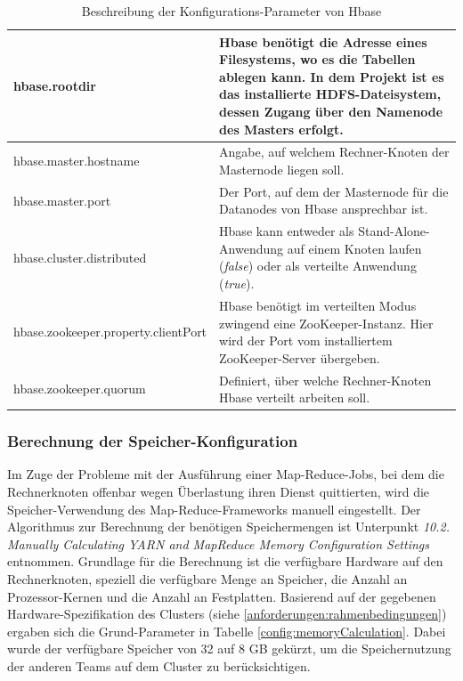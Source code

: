 \begin{table}
	\begin{tabularx}{\textwidth}{| X | X |} \hline
	hbase.rootdir &  Hbase benötigt die Adresse eines Filesystems, wo es die Tabellen ablegen kann. In dem Projekt ist es das installierte
	HDFS-Dateisystem, dessen Zugang über den Namenode des Masters erfolgt.\\ \hline
	hbase.master.hostname & Angabe, auf welchem Rechner-Knoten der Masternode liegen soll.\\ \hline
	hbase.master.port & Der Port, auf dem der Masternode für die Datanodes von Hbase ansprechbar ist. \\ \hline
	hbase.cluster.distributed & Hbase kann entweder als Stand-Alone-Anwendung auf einem Knoten laufen (\textit{false}) oder als verteilte
	 Anwendung (\textit{true}). \\ \hline
	hbase.zookeeper.property.clientPort & Hbase benötigt im verteilten Modus zwingend eine ZooKeeper-Instanz. Hier wird der Port vom
	 installiertem ZooKeeper-Server übergeben.\\ \hline
	hbase.zookeeper.quorum &  Definiert, über welche Rechner-Knoten Hbase verteilt arbeiten soll. \\ \hline
	\end{tabularx}
	\caption{Beschreibung der Konfigurations-Parameter von Hbase}
	\label{config:hbaseDescription}
\end{table}

\subsubsection{Berechnung der Speicher-Konfiguration}
Im Zuge der Probleme mit der Ausführung einer Map-Reduce-Jobs, bei dem die Rechnerknoten
offenbar wegen Überlastung ihren Dienst quittierten, wird die Speicher-Verwendung
des Map-Reduce-Frameworks manuell eingestellt. Der Algorithmus zur Berechnung der 
benötigen Speichermengen ist \cite{memoryCal} Unterpunkt \textit{ 10.2. Manually Calculating YARN and MapReduce Memory Configuration Settings} entnommen.
Grundlage für die Berechnung ist die verfügbare Hardware auf den Rechnerknoten, speziell
die verfügbare Menge an Speicher, die Anzahl an Prozessor-Kernen und die Anzahl an 
Festplatten. Basierend auf der gegebenen Hardware-Spezifikation des Clusters 
(siehe \ref{anforderungen:rahmenbedingungen}) ergaben sich die Grund-Parameter in Tabelle
\ref{config:memoryCalculation}.
Dabei wurde der verfügbare Speicher von 32 auf 8 GB gekürzt, um die Speichernutzung der
anderen Teams auf dem Cluster zu berücksichtigen.

